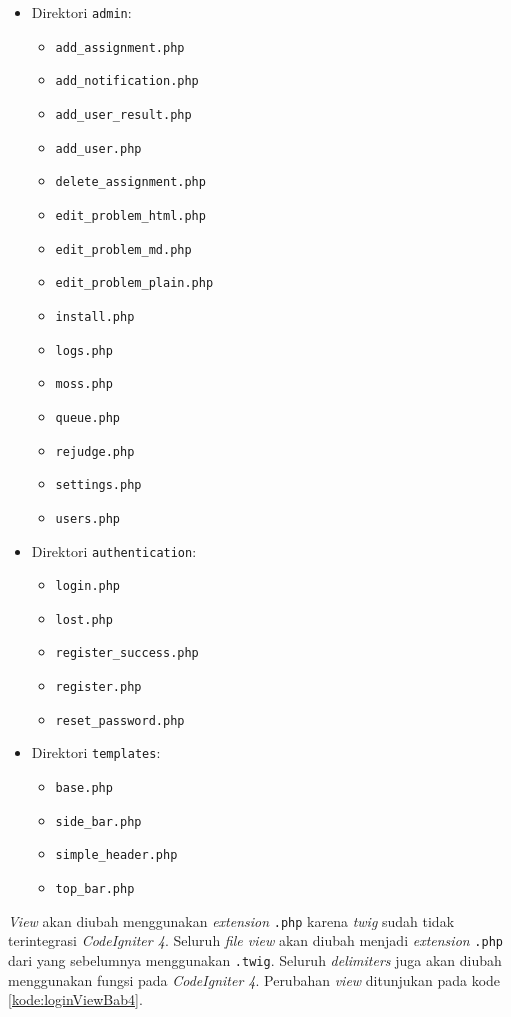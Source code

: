 \begin{itemize}
\item Direktori \texttt{admin}:
\begin{itemize}
	\item \texttt{add\_assignment.php}
	\item \texttt{add\_notification.php}
	\item \texttt{add\_user\_result.php}
	\item \texttt{add\_user.php}
	\item \texttt{delete\_assignment.php}
	\item \texttt{edit\_problem\_html.php}
	\item \texttt{edit\_problem\_md.php}
	\item \texttt{edit\_problem\_plain.php}
	\item \texttt{install.php}
	\item \texttt{logs.php}
	\item \texttt{moss.php}
	\item \texttt{queue.php}
	\item \texttt{rejudge.php}
	\item \texttt{settings.php}
	\item \texttt{users.php}
\end{itemize}
\item Direktori \texttt{authentication}:
\begin{itemize}
	\item \texttt{login.php}
	\item \texttt{lost.php}
	\item \texttt{register\_success.php}
	\item \texttt{register.php}
	\item \texttt{reset\_password.php}
\end{itemize}
\item Direktori \texttt{templates}:
\begin{itemize}
	\item \texttt{base.php}
	\item \texttt{side\_bar.php}
	\item \texttt{simple\_header.php}
	\item \texttt{top\_bar.php}
\end{itemize}
\end{itemize}

\textit{View} akan diubah menggunakan \textit{extension} \texttt{.php} karena \textit{twig} sudah tidak terintegrasi \textit{CodeIgniter 4}. Seluruh \textit{file view} akan diubah menjadi \textit{extension} \texttt{.php} dari yang sebelumnya menggunakan \texttt{.twig}. Seluruh \textit{delimiters} juga akan diubah menggunakan fungsi pada \textit{CodeIgniter 4}. Perubahan \textit{view} ditunjukan pada kode \ref{kode:loginViewBab4}.

